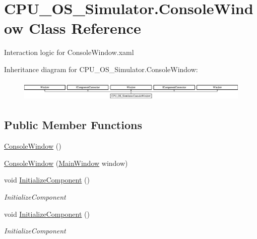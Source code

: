\hypertarget{class_c_p_u___o_s___simulator_1_1_console_window}{}\section{C\+P\+U\+\_\+\+O\+S\+\_\+\+Simulator.\+Console\+Window Class Reference}
\label{class_c_p_u___o_s___simulator_1_1_console_window}


Interaction logic for Console\+Window.\+xaml  


Inheritance diagram for C\+P\+U\+\_\+\+O\+S\+\_\+\+Simulator.\+Console\+Window\+:\begin{figure}[H]
\begin{center}
\leavevmode
\includegraphics[height=1.004484cm]{class_c_p_u___o_s___simulator_1_1_console_window}
\end{center}
\end{figure}
\subsection*{Public Member Functions}
\begin{DoxyCompactItemize}
\item 
\hyperlink{class_c_p_u___o_s___simulator_1_1_console_window_abdd222b591f72c19297dc5805059ee7e}{Console\+Window} ()
\item 
\hyperlink{class_c_p_u___o_s___simulator_1_1_console_window_a3c20f504dabf2d202564fdde8d54bab4}{Console\+Window} (\hyperlink{class_c_p_u___o_s___simulator_1_1_main_window}{Main\+Window} window)
\item 
void \hyperlink{class_c_p_u___o_s___simulator_1_1_console_window_a5961ed9b274d16fab841f34bc178b52f}{Initialize\+Component} ()
\begin{DoxyCompactList}\small\item\em Initialize\+Component \end{DoxyCompactList}\item 
void \hyperlink{class_c_p_u___o_s___simulator_1_1_console_window_a5961ed9b274d16fab841f34bc178b52f}{Initialize\+Component} ()
\begin{DoxyCompactList}\small\item\em Initialize\+Component \end{DoxyCompactList}\end{DoxyCompactItemize}
